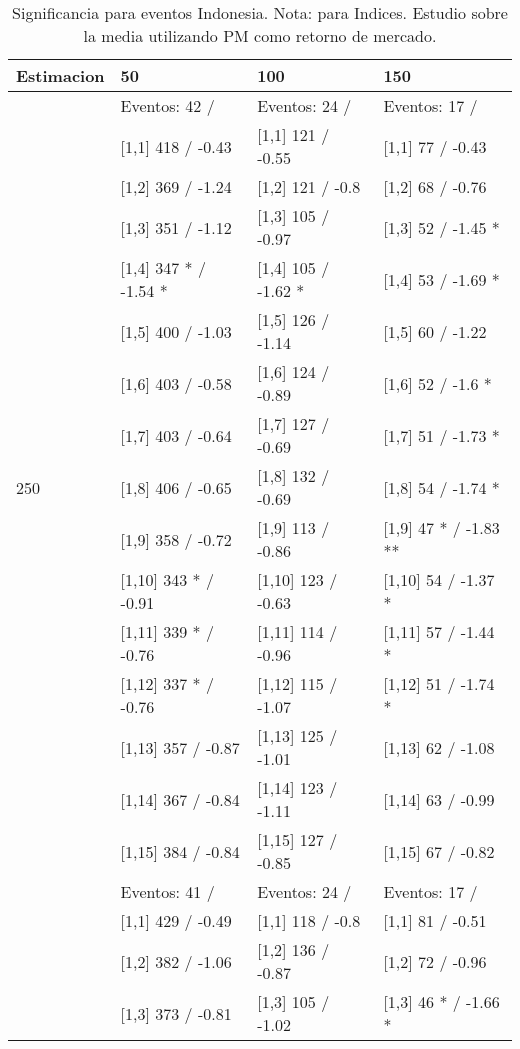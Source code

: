 \begin{table}

\caption{Significancia para eventos Indonesia. Nota: para Indices. Estudio sobre la media utilizando PM como retorno de mercado.}
\centering
\begin{tabular}[t]{llll}
\toprule
Estimacion & 50 & 100 & 150\\
\midrule
 & Eventos:  42 / & Eventos:  24 / & Eventos:  17 /\\
 & {}[1,1] 418  / -0.43 & {}[1,1] 121  / -0.55 & {}[1,1] 77  / -0.43\\
 & {}[1,2] 369  / -1.24 & {}[1,2] 121  / -0.8 & {}[1,2] 68  / -0.76\\
 & {}[1,3] 351  / -1.12 & {}[1,3] 105  / -0.97 & {}[1,3] 52  / -1.45 *\\
 & {}[1,4] 347 * / -1.54 * & {}[1,4] 105  / -1.62 * & {}[1,4] 53  / -1.69 *\\
\addlinespace
 & {}[1,5] 400  / -1.03 & {}[1,5] 126  / -1.14 & {}[1,5] 60  / -1.22\\
 & {}[1,6] 403  / -0.58 & {}[1,6] 124  / -0.89 & {}[1,6] 52  / -1.6 *\\
 & {}[1,7] 403  / -0.64 & {}[1,7] 127  / -0.69 & {}[1,7] 51  / -1.73 *\\
250 & {}[1,8] 406  / -0.65 & {}[1,8] 132  / -0.69 & {}[1,8] 54  / -1.74 *\\
 & {}[1,9] 358  / -0.72 & {}[1,9] 113  / -0.86 & {}[1,9] 47 * / -1.83 **\\
\addlinespace
 & {}[1,10] 343 * / -0.91 & {}[1,10] 123  / -0.63 & {}[1,10] 54  / -1.37 *\\
 & {}[1,11] 339 * / -0.76 & {}[1,11] 114  / -0.96 & {}[1,11] 57  / -1.44 *\\
 & {}[1,12] 337 * / -0.76 & {}[1,12] 115  / -1.07 & {}[1,12] 51  / -1.74 *\\
 & {}[1,13] 357  / -0.87 & {}[1,13] 125  / -1.01 & {}[1,13] 62  / -1.08\\
 & {}[1,14] 367  / -0.84 & {}[1,14] 123  / -1.11 & {}[1,14] 63  / -0.99\\
\addlinespace
 & {}[1,15] 384  / -0.84 & {}[1,15] 127  / -0.85 & {}[1,15] 67  / -0.82\\
 & Eventos:  41 / & Eventos:  24 / & Eventos:  17 /\\
 & {}[1,1] 429  / -0.49 & {}[1,1] 118  / -0.8 & {}[1,1] 81  / -0.51\\
 & {}[1,2] 382  / -1.06 & {}[1,2] 136  / -0.87 & {}[1,2] 72  / -0.96\\
 & {}[1,3] 373  / -0.81 & {}[1,3] 105  / -1.02 & {}[1,3] 46 * / -1.66 *\\

\end{tabular}
\end{table}
